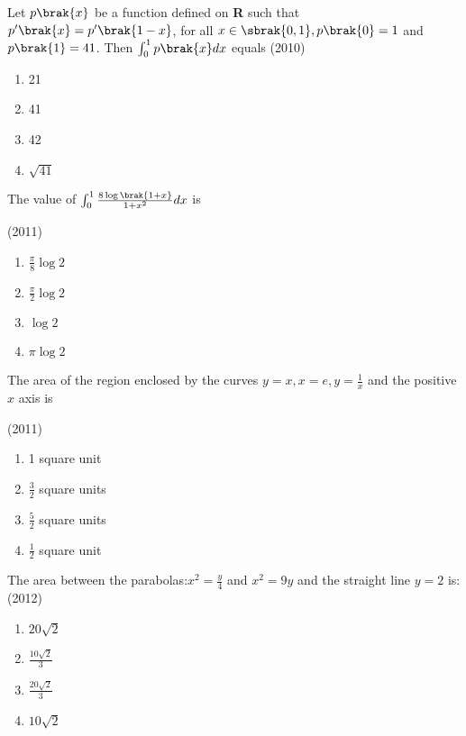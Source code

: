 	\item Let $p\brak{x}$ be a function defined on \textbf{R} such that $p'\brak{x}=p'\brak{1-x}$, for all $x\in\sbrak{0,1},p\brak{0}=1$ and $p\brak{1}=41$. Then $\int_0^1p\brak{x}dx$ equals
		\hfill{(2010)}

		\begin{multicols}{4}
			\begin{enumerate}
				\item 21
				\item 41
				\item 42
				\item $\sqrt{41}$
			\end{enumerate}
		\end{multicols}

	\item The value of $\int_0^1\frac{8\log\brak{1+x}}{1+x^2}dx$ is

		\hfill{(2011)}

		\begin{multicols}{2}
			\begin{enumerate}
				\item $\frac{\pi}{8}\log2$
				\item $\frac{\pi}{2}\log2$
				\item $\log 2$
				\item $\pi \log2$
			\end{enumerate}
		\end{multicols}

	\item The area of the region enclosed by the curves $y=x, x=e, y=\frac{1}{x}$ and the positive $x$ axis is

		\hfill{(2011)}

		\begin{multicols}{2}
			\begin{enumerate}
				\item 1 square unit
				\item $\frac{3}{2}$ square units
				\item $\frac{5}{2}$ square units
				\item $\frac{1}{2}$ square unit
			\end{enumerate}
		\end{multicols}

	\item The area between the parabolas:$x^2=\frac{y}{4}$ and $x^2=9y$ and the straight line $y=2$ is:
		\hfill{(2012)}

		\begin{multicols}{4}
			\begin{enumerate}
				\item $20\sqrt{2}$
				\item $\frac{10\sqrt{2}}{3}$
				\item $\frac{20\sqrt{2}}{3}$
				\item $10\sqrt{2}$
			\end{enumerate}
		\end{multicols}


